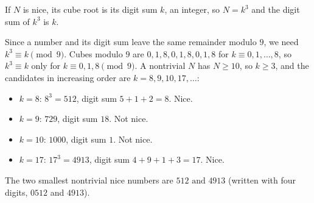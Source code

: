 If $N$ is nice, its cube root is its digit sum $k$, an integer, so $N=k^3$ and the digit sum of $k^3$ is $k$.

Since a number and its digit sum leave the same remainder modulo $9$, we need $k^3\equiv k\pmod9$. Cubes modulo $9$ are $0,1,8,0,1,8,0,1,8$ for $k\equiv0,1,\dots,8$, so $k^3\equiv k$ only for $k\equiv0,1,8\pmod9$. A nontrivial $N$ has $N\ge10$, so $k\ge3$, and the candidates in increasing order are $k=8,9,10,17,\dots$:
\begin{itemize}
\item $k=8$: $8^3=512$, digit sum $5+1+2=8$. Nice.
\item $k=9$: $729$, digit sum $18$. Not nice.
\item $k=10$: $1000$, digit sum $1$. Not nice.
\item $k=17$: $17^3=4913$, digit sum $4+9+1+3=17$. Nice.
\end{itemize}
The two smallest nontrivial nice numbers are $\boxed{512\text{ and }4913}$ (written with four digits, $0512$ and $4913$).
